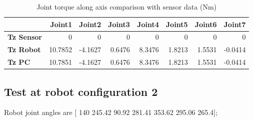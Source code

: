 \begin{table}[h!]
	\centering
	\caption{Joint torque along axis comparison with sensor data (Nm)}
	\label{wrech_Sensor_Pose1}
	\begin{tabular}{|l|r|r|r|r|r|r|r|}
		\hline
		\textbf{} & \textbf{Joint1} & \textbf{Joint2} & \textbf{Joint3} & \textbf{Joint4} & \textbf{Joint5} & \textbf{Joint6} & \textbf{Joint7} \\ \hline
		\textbf{Tz Sensor}  & 0           & 0           & 0            & 0           & 0           & 0           & 0           \\ \hline
		\textbf{Tz Robot}  	& 10.7852           & -4.1627           & 0.6476            & 8.3476           & 1.8213           & 1.5531           & -0.0414           \\ \hline
		\textbf{Tz PC}  	& 10.7851           & -4.1627           & 0.6476            & 8.3476           & 1.8213           & 1.5531           & -0.0414           \\ \hline
	\end{tabular}
\end{table}


\subsection{Test at robot configuration 2}
Robot joint angles are  [ 140        245.42         90.92        281.41        353.62        295.06         265.4];

